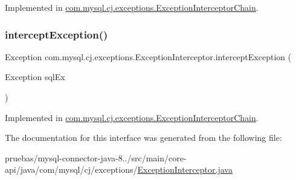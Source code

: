 Implemented in \mbox{\hyperlink{classcom_1_1mysql_1_1cj_1_1exceptions_1_1_exception_interceptor_chain_ae29710eae9d22d426baabd3b2e589fec}{com.\+mysql.\+cj.\+exceptions.\+Exception\+Interceptor\+Chain}}.

\mbox{\label{interfacecom_1_1mysql_1_1cj_1_1exceptions_1_1_exception_interceptor_ab77cba0ffef1d2d6921d29e2eb79b072}} 
\subsubsection{\texorpdfstring{intercept\+Exception()}{interceptException()}}
{\footnotesize\ttfamily Exception com.\+mysql.\+cj.\+exceptions.\+Exception\+Interceptor.\+intercept\+Exception (\begin{DoxyParamCaption}\item[{Exception}]{sql\+Ex }\end{DoxyParamCaption})}



Implemented in \mbox{\hyperlink{classcom_1_1mysql_1_1cj_1_1exceptions_1_1_exception_interceptor_chain_a78c915d6aa11122e3fd845532ad29eb5}{com.\+mysql.\+cj.\+exceptions.\+Exception\+Interceptor\+Chain}}.



The documentation for this interface was generated from the following file\+:\begin{DoxyCompactItemize}
\item 
pruebas/mysql-\/connector-\/java-\/8../src/main/core-\/api/java/com/mysql/cj/exceptions/\mbox{\hyperlink{_exception_interceptor_8java}{Exception\+Interceptor.\+java}}\end{DoxyCompactItemize}
